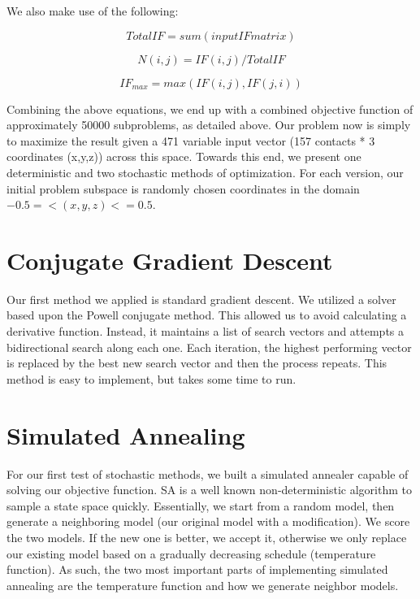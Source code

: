 \documentclass{article}
\begin{document}
We also make use of the following:

\begin{equation}
      TotalIF = sum(input IF matrix)
\end{equation}

\begin{equation}
      N(i,j) = IF(i,j)/TotalIF
\end{equation}

\begin{equation}
      IF_{max} = max(IF(i,j),IF(j,i))
\end{equation}

Combining the above equations, we end up with a combined objective function of approximately 50000 subproblems, as detailed above.  Our problem now is simply to maximize the result given a 471 variable input vector (157 contacts * 3 coordinates (x,y,z)) across this space.  Towards this end, we present one deterministic and two stochastic methods of optimization.  For each version, our initial problem subspace is randomly chosen coordinates in the domain $-0.5 =< (x, y, z) <= 0.5$. 

\section{Conjugate Gradient Descent}

Our first method we applied is standard gradient descent.  We utilized a solver based upon the Powell conjugate method.  This allowed us to avoid calculating a derivative function.  Instead, it maintains a list of search vectors and attempts a bidirectional search along each one.  Each iteration, the highest performing vector is replaced by the best new search vector and then the process repeats.  This method is easy to implement, but takes some time to run.

\section{Simulated Annealing}

For our first test of stochastic methods, we built a simulated annealer capable of solving our objective function.  SA is a well known non-deterministic algorithm to sample a state space quickly.  Essentially, we start from a random model, then generate a neighboring model (our original model with a modification).  We score the two models.  If the new one is better, we accept it, otherwise we only replace our existing model based on a gradually decreasing schedule (temperature function).  As such, the two most important parts of implementing simulated annealing are the temperature function and how we generate neighbor models.
\end{document}
